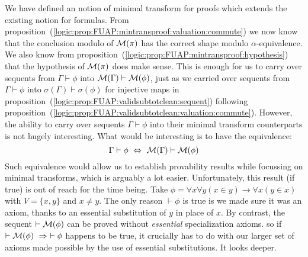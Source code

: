 We have defined an notion of minimal transform for proofs which
extends the existing notion for formulas. From
proposition~(\ref{logic:prop:FUAP:mintransproof:valuation:commute})
we now know that the conclusion modulo of ${\cal M}(\pi)$ has the
correct shape modulo $\alpha$-equivalence. We also know from
proposition~(\ref{logic:prop:FUAP:mintransproof:hypothesis}) that
the hypothesis of ${\cal M}(\pi)$ does make sense. This is enough
for us to carry over sequents from $\Gamma\vdash\phi$ into ${\cal
M}(\Gamma)\vdash{\cal M}(\phi)$, just as we carried over sequents
from $\Gamma\vdash\phi$ into $\sigma(\Gamma)\vdash\sigma(\phi)$ for
injective maps in
proposition~(\ref{logic:prop:FUAP:validsubtotclean:sequent})
following
proposition~(\ref{logic:prop:FUAP:validsubtotclean:valuation:commute}).
However, the ability to carry over sequents $\Gamma\vdash\phi$ into
their minimal transform counterparts is not hugely interesting. What
would be interesting is to have the equivalence:
     \[
    \Gamma\vdash\phi\ \Leftrightarrow\ {\cal M}(\Gamma)\vdash{\cal
    M}(\phi)
    \]
Such equivalence would allow us to establish provability results
while focussing on minimal transforms, which is arguably a lot
easier. Unfortunately, this result (if true) is out of reach for the
time being. Take $\phi=\forall x\forall y(x \in y)\to\forall x(y\in
x)$ with $V=\{x,y\}$ and $x\neq y$. The only reason $\vdash\phi$ is
true is we made sure it was an axiom, thanks to an essential
substitution of $y$ in place of $x$. By contrast, the sequent
$\vdash{\cal M}(\phi)$ can be proved without {\em essential}
specialization axioms. so if $\vdash{\cal M}(\phi)\ \Rightarrow\
\vdash\phi$ happens to be true, it crucially has to do with our
larger set of axioms made possible by the use of essential
substitutions. It looks deeper.

